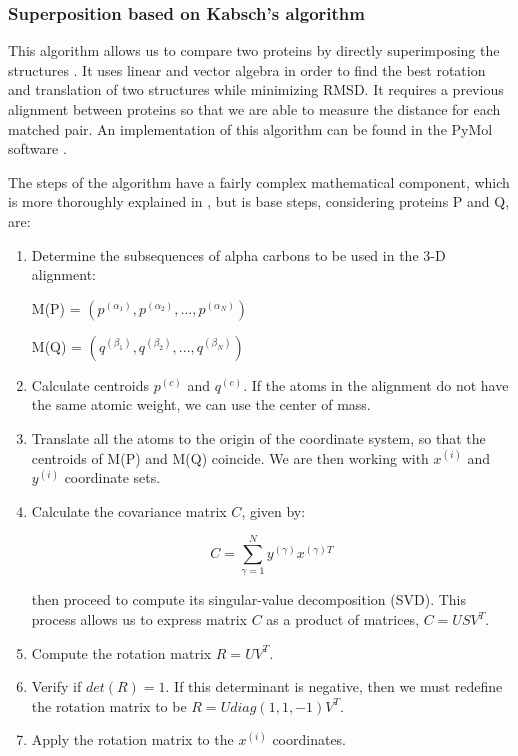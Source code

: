 \subsubsection{Superposition based on Kabsch's algorithm}

This algorithm allows us to compare two proteins by directly superimposing the structures \cite{kabsch1976solution}. It uses linear and vector algebra in order to find the best rotation and translation of two structures while minimizing RMSD. It requires a previous alignment between proteins so that we are able to measure the distance for each matched pair. An implementation of this algorithm can be found in the PyMol software \cite{delano2002pymol}.

The steps of the algorithm have a fairly complex mathematical component, which is more thoroughly explained in \cite{burkowski2008structural}, but is base steps, considering proteins P and Q, are:
\begin{enumerate}
	\item Determine the subsequences of alpha carbons to be used in the 3-D alignment:
	\begin{center}
		M(P) = $(p^{(\alpha_{1})},p^{(\alpha_{2})},...,p^{(\alpha_{N})})$
		
		M(Q) = $(q^{(\beta_{1})},q^{(\beta_{2})},...,q^{(\beta_{N})})$
	\end{center}
	\item Calculate centroids $p^{(c)}$ and $q^{(c)}$. If the atoms in the alignment do not have the same atomic weight, we can use the center of mass.
	\item Translate all the atoms to the origin of the coordinate system, so that the centroids of M(P) and M(Q) coincide. We are then working with $x^{(i)}$ and $y^{(i)}$ coordinate sets.
	\item Calculate the covariance matrix $C$, given by:
	
	$$C = \sum_{\gamma=1}^{N} y^{(\gamma)}x^{(\gamma)T}$$ 
	
	then proceed to compute its singular-value decomposition (SVD). This process allows us to express matrix $C$ as a product of matrices, $C = USV^{T}$.
	\item Compute the rotation matrix $R = UV^{T}$.
	\item Verify if $det(R) = 1$. If this determinant is negative, then we must redefine the rotation matrix to be $R = Udiag(1,1,-1)V^{T}$.
	\item Apply the rotation matrix to the $x^{(i)}$ coordinates.
\end{enumerate}

